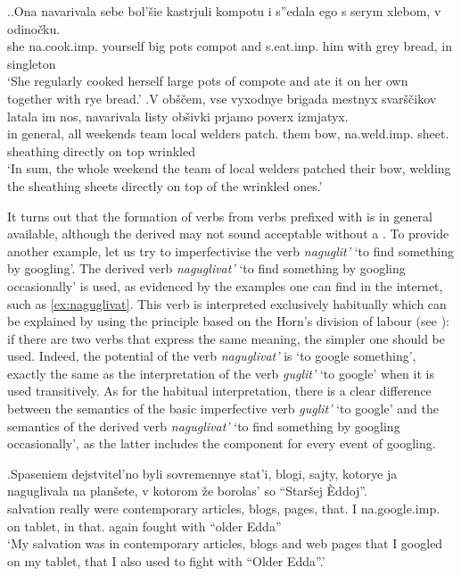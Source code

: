 \ex.\ag.\label{ex:navarivat2}Ona navarivala sebe bol'\v{s}ie kastrjuli kompotu i s''edala ego s serym xlebom, v odino\v{c}ku.\\
she na.cook.imp. yourself big pots compot and s.eat.imp. him with grey bread, in singleton\\
\trans `She regularly cooked herself large pots of compote and ate it on her own together with rye bread.'
\bg.\label{ex:navarivat1}V ob\v{s}\v{c}em, vse vyxodnye brigada mestnyx svar\v{s}\v{c}ikov latala im nos, navarivala listy ob\v{s}ivki prjamo poverx izmjatyx.\\
in general, all weekends team local welders patch. them bow, na.weld.imp. sheet. sheathing directly {on top} wrinkled\\
\trans `In sum, the whole weekend the team of local welders patched their bow, welding the sheathing sheets directly on top of the wrinkled ones.'

It turns out that the formation of  verbs from verbs prefixed with   is in general available, although the derived  may not sound acceptable without a . To provide another example, let us try to imperfectivise the verb \textit{naguglit'} `to find something by googling'. The derived verb \textit{naguglivat'} `to find something by googling occasionally' is used, as evidenced by the examples one can find in the internet, such as \ref{ex:naguglivat}. This verb is interpreted exclusively habitually which can be explained by using the principle based on the Horn's division of labour (see \citealt{Horn:84}): if there are two verbs that express the same meaning, the simpler one should be used. Indeed, the potential  of the verb \textit{naguglivat'} is `to google something', exactly the same as the interpretation of the verb \textit{guglit'} `to google' when it is used transitively. As for the habitual interpretation, there is a clear difference between the semantics of the basic imperfective verb \textit{guglit'} `to google' and the semantics of the derived  verb \textit{naguglivat'} `to find something by googling occasionally', as the latter includes the  component for every event of googling. 

\exg.\label{ex:naguglivat}Spaseniem dejstvitel'no byli sovremennye stat'i, blogi, sajty, kotorye ja naguglivala na plan\v{s}ete, v kotorom \v{z}e borolas' so ``Star\v{s}ej \`{E}ddoj''.\\
salvation really were contemporary articles, blogs, pages, that. I na.google.imp. on tablet, in that. again fought with ``older Edda''\\
\trans `My salvation was in contemporary articles, blogs and web pages that I googled on my tablet, that I also used to fight with ``Older Edda''.'\\

